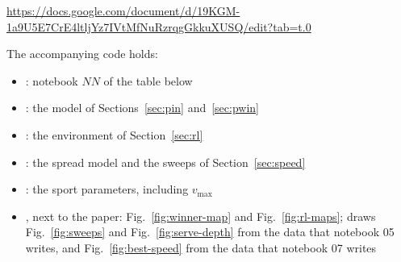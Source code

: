   \begin{sloppypar}
    \noindent\url{https://docs.google.com/document/d/19KGM-1a9U5E7CrE4ltljYz7IVtMfNuRzrqgGkkuXUSQ/edit?tab=t.0}
  \end{sloppypar}

  The accompanying code holds:

  \begin{itemize}
    \item {}: notebook $NN$ of the table
    below

    \item {}: the model
    of Sections~\ref{sec:pin} and~\ref{sec:pwin}

    \item {}: the environment
    of Section~\ref{sec:rl}

    \item {}: the
    spread model and the sweeps of Section~\ref{sec:speed}

    \item {}: the sport parameters, including $v_{\max}$

    \item {}, next to the paper:
    Fig.~\ref{fig:winner-map} and Fig.~\ref{fig:rl-maps};
     draws Fig.~\ref{fig:sweeps} and
    Fig.~\ref{fig:serve-depth} from the data that notebook 05 writes, and
    Fig.~\ref{fig:best-speed} from the data that notebook 07 writes
  \end{itemize}

